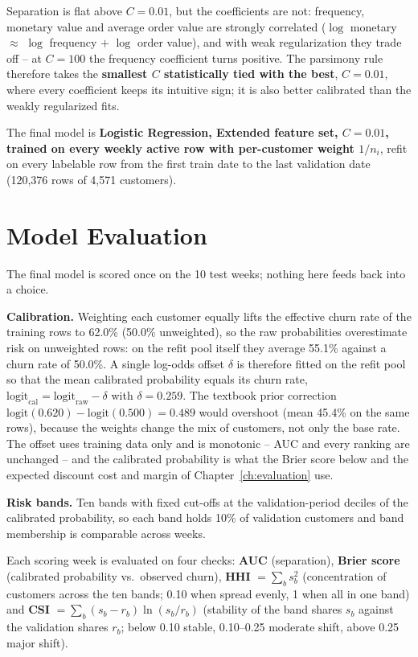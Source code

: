 Separation is flat above $C = 0.01$, but the coefficients are not: frequency, monetary value and average order value are strongly correlated ($\log$ monetary $\approx$ $\log$ frequency $+$ $\log$ order value), and with weak regularization they trade off -- at $C = 100$ the frequency coefficient turns positive. The parsimony rule therefore takes the \textbf{smallest $C$ statistically tied with the best}, $C = 0.01$, where every coefficient keeps its intuitive sign; it is also better calibrated than the weakly regularized fits.

The final model is \textbf{Logistic Regression, Extended feature set, $C = 0.01$, trained on every weekly active row with per-customer weight $1/n_i$}, refit on every labelable row from the first train date to the last validation date (120,376 rows of 4,571 customers).

\section{Model Evaluation}
\label{sec:6-quality}

The final model is scored once on the 10 test weeks; nothing here feeds back into a choice.

\textbf{Calibration.} Weighting each customer equally lifts the effective churn rate of the training rows to 62.0\% (50.0\% unweighted), so the raw probabilities overestimate risk on unweighted rows: on the refit pool itself they average 55.1\% against a churn rate of 50.0\%. A single log-odds offset $\delta$ is therefore fitted on the refit pool so that the mean calibrated probability equals its churn rate, $\text{logit}_{\text{cal}} = \text{logit}_{\text{raw}} - \delta$ with $\delta = 0.259$. The textbook prior correction $\text{logit}(0.620) - \text{logit}(0.500) = 0.489$ would overshoot (mean 45.4\% on the same rows), because the weights change the mix of customers, not only the base rate. The offset uses training data only and is monotonic -- AUC and every ranking are unchanged -- and the calibrated probability is what the Brier score below and the expected discount cost and margin of Chapter~\ref{ch:evaluation} use.

\textbf{Risk bands.} Ten bands with fixed cut-offs at the validation-period deciles of the calibrated probability, so each band holds 10\% of validation customers and band membership is comparable across weeks.

Each scoring week is evaluated on four checks: \textbf{AUC} (separation), \textbf{Brier score} (calibrated probability vs.\ observed churn), \textbf{HHI} $= \sum_b s_b^2$ (concentration of customers across the ten bands; 0.10 when spread evenly, 1 when all in one band) and \textbf{CSI} $= \sum_b (s_b - r_b)\ln(s_b / r_b)$ (stability of the band shares $s_b$ against the validation shares $r_b$; below 0.10 stable, 0.10--0.25 moderate shift, above 0.25 major shift).

